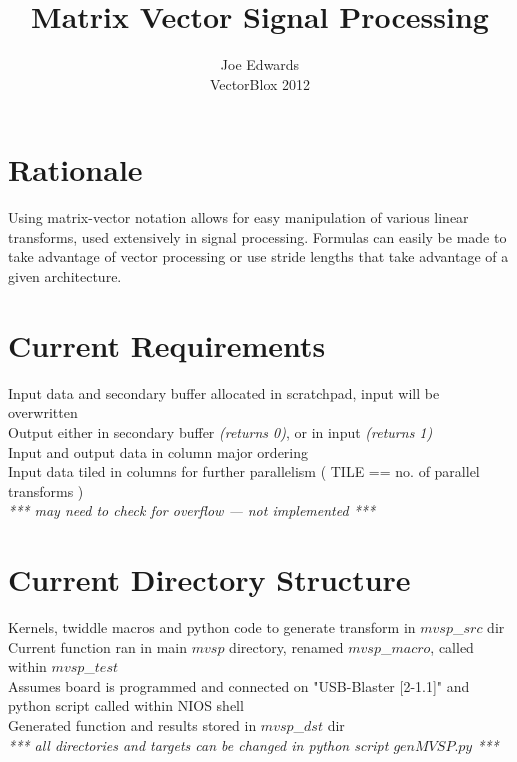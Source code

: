 \documentclass[11pt]{article}
\title{Matrix Vector Signal Processing}
\author{Joe Edwards \\ VectorBlox 2012}
\date{}
\begin{document}
\maketitle

\section*{Rationale}
Using matrix-vector notation allows for easy manipulation of various linear transforms, used extensively in signal processing. Formulas can easily be made to take advantage of vector processing or use stride lengths that take advantage of a given architecture.

\section*{Current Requirements}
Input data and secondary buffer allocated in scratchpad, input will be overwritten\\
Output either in secondary buffer \emph{(returns 0)}, or in input \emph{(returns 1)}\\ 
Input and output data in column major ordering\\
Input data tiled in columns for further parallelism ( TILE == no. of parallel transforms )\\
\emph{*** may need to check for overflow --- not implemented ***}

\section*{Current Directory Structure}
Kernels, twiddle macros and python code to generate transform in $mvsp$\_$src$ dir\\
Current function ran in main $mvsp$ directory, renamed $mvsp$\_$macro$, called within $mvsp$\_$test$\\ 
Assumes board is programmed and connected on "USB-Blaster [2-1.1]" and python script called within NIOS shell\\
Generated function and results stored in $mvsp$\_$dst$ dir\\
\emph{*** all directories and targets can be changed in python script $genMVSP.py$ ***}
\end{document}
